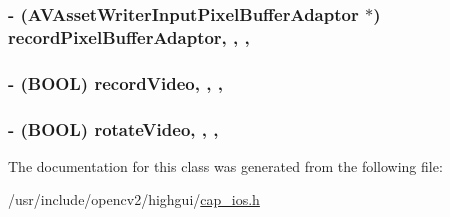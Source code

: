 \hypertarget{interfaceCvVideoCamera_a9bf206f012ee17fbcb79b9f57ae27cb0}{
\subsubsection[{record\-Pixel\-Buffer\-Adaptor}]{\setlength{\rightskip}{0pt plus 5cm}-\/ (A\-V\-Asset\-Writer\-Input\-Pixel\-Buffer\-Adaptor $\ast$) record\-Pixel\-Buffer\-Adaptor\hspace{0.3cm}{\ttfamily [read]}, {\ttfamily [write]}, {\ttfamily [nonatomic]}, {\ttfamily [retain]}}}\label{interfaceCvVideoCamera_a9bf206f012ee17fbcb79b9f57ae27cb0}
\hypertarget{interfaceCvVideoCamera_a7a2d067e74a18cd9cc5ee7626ac27660}{
\subsubsection[{record\-Video}]{\setlength{\rightskip}{0pt plus 5cm}-\/ (B\-O\-O\-L) record\-Video\hspace{0.3cm}{\ttfamily [read]}, {\ttfamily [write]}, {\ttfamily [nonatomic]}, {\ttfamily [assign]}}}\label{interfaceCvVideoCamera_a7a2d067e74a18cd9cc5ee7626ac27660}
\hypertarget{interfaceCvVideoCamera_a506e54c016c4fccb68eed2fe088e3929}{
\subsubsection[{rotate\-Video}]{\setlength{\rightskip}{0pt plus 5cm}-\/ (B\-O\-O\-L) rotate\-Video\hspace{0.3cm}{\ttfamily [read]}, {\ttfamily [write]}, {\ttfamily [nonatomic]}, {\ttfamily [assign]}}}\label{interfaceCvVideoCamera_a506e54c016c4fccb68eed2fe088e3929}


The documentation for this class was generated from the following file\-:\begin{DoxyCompactItemize}
\item 
/usr/include/opencv2/highgui/\hyperlink{cap__ios_8h}{cap\-\_\-ios.\-h}\end{DoxyCompactItemize}

